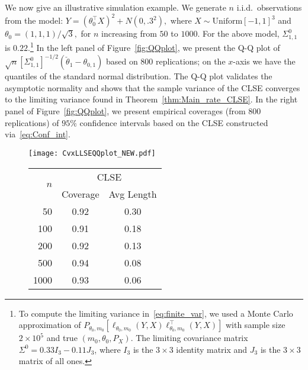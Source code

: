 {{We now give an illustrative simulation example.  We generate $n$ i.i.d.~observations from the model: $Y=(\theta_0^\top X)^2 + N(0, .3^2),$ where $ X \sim \text{Uniform} [-1, 1]^3$ and $\theta_0 = (1,1,1)/\sqrt{3},$ for $n$ increasing from $50$ to $1000.$  For the above model, $\Sigma^0_{1,1}$ is $0.22$.\footnote{To compute the limiting variance in~\eqref{eq:finite_var}, we used a Monte Carlo approximation of $P_{\theta_0,m_0}[ {\ell}_{\theta_0,m_0}(Y,X) {\ell}^\top_{\theta_0,m_0}(Y,X)]$ with sample size $2\times 10^5$ and true $(m_0, \theta_0, P_X)$. The limiting covariance matrix $\Sigma^0 = 0.33 {I}_3 - 0.11 J_3$, where $I_3$ is the $3\times 3$ identity matrix and $J_3$ is the $3\times 3$ matrix of all ones.} In the left panel of Figure~\ref{fig:QQplot}, we present the Q-Q plot of $\sqrt{n}[\Sigma^0_{1,1}]^{-1/2}(\check{\theta}_{1}-\theta_{0,1})$  based on 800 replications; on the $x$-axis we have the quantiles of the standard normal distribution. The Q-Q plot validates the asymptotic normality and shows that the sample variance of the CLSE converges to the limiting variance found in Theorem~\ref{thm:Main_rate_CLSE}.  In the right panel of Figure~\ref{fig:QQplot}, we present empirical coverages (from $800$ replications) of $95\%$ confidence intervals based on  the CLSE constructed via~\eqref{eq:Conf_int}.
}

\begin{figure}[!h]
  \begin{minipage}{0.50\linewidth}
    \centering
  \texttt{[image: CvxLLSEQQplot\_NEW.pdf]}%
      \par

  \end{minipage}%
  \begin{minipage}{0.50\linewidth}
    \centering
\begin{tabular}{rcc}
  \toprule
   \multirow{2}{*}{$n$} &  \multicolumn{2}{c}{CLSE}\\
   \cmidrule(lr){2-3} 
 & Coverage & Avg Length\\
  \hline
  50  & 0.92 & 0.30 \\
  100  & 0.91 & 0.18 \\
  200  & 0.92 & 0.13 \\
  500  & 0.94 & 0.08 \\
  1000  & 0.93 & 0.06 \\
   \hline
   

\end{tabular}
\end{minipage}
\end{figure}}
